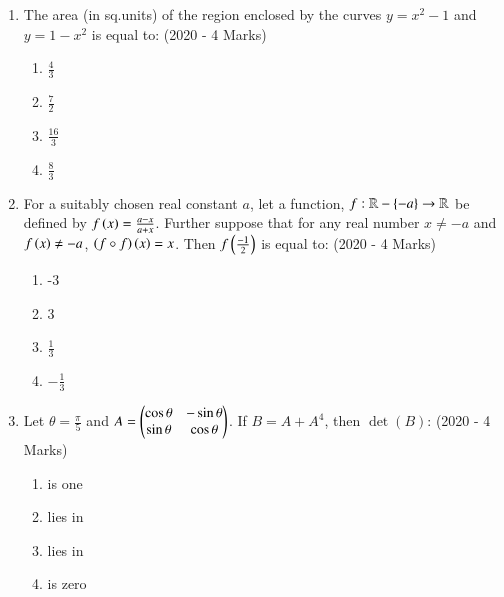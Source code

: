 \documentclass[journal]{IEEEtran}
\begin{document}
\begin{enumerate}
{        %
        
        }
    \item{
            The area (in sq.units) of the region enclosed by the curves $y = x^2-1$ and $y = 1-x^2$ is equal to:
             \hfill
                {(2020 - 4 Marks)}
            \begin{multicols}{4}
                \begin{enumerate}
                    \item $\frac{4}{3}$
                   	\item $\frac{7}{2}$
                   	\item $\frac{16}{3}$
                    \item $\frac{8}{3}$
                \end{enumerate}
            \end{multicols}
        
        }
    \item{
            For a suitably chosen real constant $a$, let a function, $f: \mathbb{R} - \left\{-a\right\} \rightarrow \mathbb{R}$ be defined by $f\left(x\right) = \frac{a-x}{a+x}$. Further suppose that for any real number $x \neq -a$ and $f\left(x\right) \neq -a$, $\left(f \circ f\right)\left(x\right) = x$. Then $f\left(\frac{-1}{2}\right)$ is equal to:
             \hfill
                {(2020 - 4 Marks)}
			\begin{multicols}{4}
				\begin{enumerate}
					\item -3
					\item 3
					\item $\frac{1}{3}$
					\item $-\frac{1}{3}$
				\end{enumerate}
			\end{multicols}
        
        }
    \item{
        
            Let $\theta = \frac{\pi}{5}$ and $A = \begin{pmatrix} \cos\theta & -\sin\theta \\ \sin\theta & \cos\theta\end{pmatrix}$. If $B = A + A^4$, then $\det(B)$:
             \text{   }\hfill
                {(2020 - 4 Marks)}
            \begin{multicols}{2}
                \begin{enumerate}
                   	\item is one
                    \item lies in 
                    \item lies in 
                    \item is zero
                \end{enumerate}
            \end{multicols}
        
}
\end{enumerate}
\end{document}
